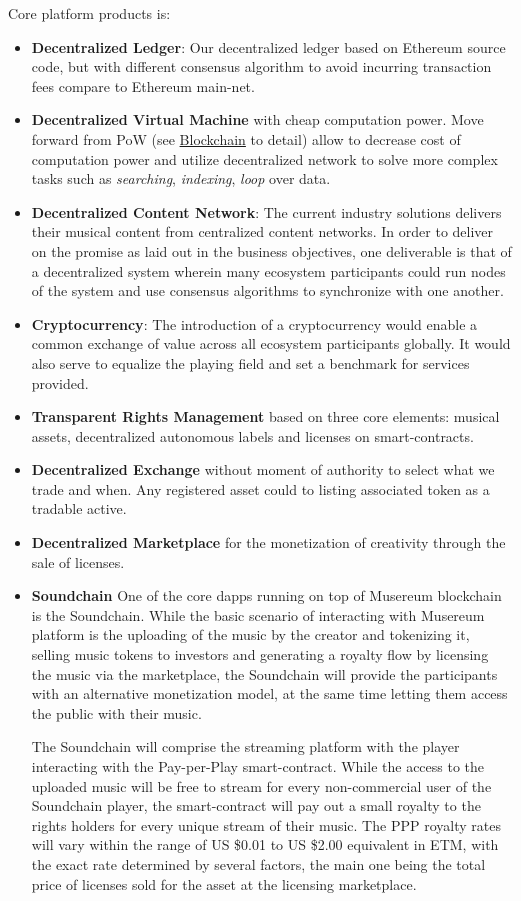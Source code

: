 \documentclass[12pt]{report}
\begin{document}
Core platform products is:
\begin{itemize}
	\item \textbf{Decentralized Ledger}: Our decentralized ledger based on Ethereum source code, but with different consensus algorithm to avoid incurring transaction fees compare to Ethereum main-net.
	\item \textbf{Decentralized Virtual Machine} with cheap computation power. Move forward from PoW (see \hyperref[tech-blockchain]{Blockchain} to detail) allow to decrease cost of computation power and utilize decentralized network to solve more complex tasks such as \textit{searching}, \textit{indexing}, \textit{loop} over data.
	\item \textbf{Decentralized Content Network}: The current industry solutions  delivers their musical content from centralized content networks. In order to deliver on the promise as laid out in the business objectives, one deliverable is that of a decentralized system wherein many ecosystem participants could run nodes of the system and use consensus algorithms to synchronize
with one another.
	\item \textbf{Cryptocurrency}: The introduction of a cryptocurrency would enable a common exchange of value across all ecosystem participants globally. It would also serve to equalize the playing field and set a benchmark for services provided.
	\item \textbf{Transparent Rights Management} based on three core elements: musical assets, decentralized autonomous labels and licenses on smart-contracts.
	\item \textbf{Decentralized Exchange} without moment of authority to select what we trade and when. Any registered asset could to listing associated token as a tradable active.
	\item \textbf{Decentralized Marketplace} for the monetization of creativity through the sale of licenses.
	\item \textbf{Soundchain} One of the core dapps running on top of Musereum blockchain is the Soundchain. While the basic scenario of interacting with Musereum platform is the uploading of the music by the creator and tokenizing it, selling music tokens to investors and generating a royalty flow by licensing the music via the marketplace, the Soundchain will provide the participants with an alternative monetization model, at the same time letting them access the public with their music.
 
The Soundchain will comprise the streaming platform with the player interacting with the Pay-per-Play smart-contract. While the access to the uploaded music will be free to stream for every non-commercial user of the Soundchain player, the smart-contract will pay out a small royalty to the rights holders for every unique stream of their music. The PPP royalty rates will vary within the range of US \$0.01 to US \$2.00 equivalent in ETM, with the exact rate determined by several factors, the main one being the total price of licenses sold for the asset at the licensing marketplace.
 

\end{itemize}
\end{document}
